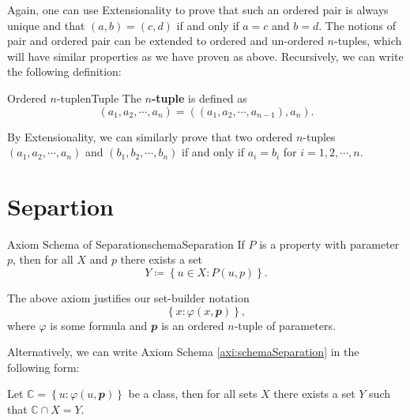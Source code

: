 \documentclass[math]{amznotes}
\theoremstyle{remark}
\begin{document}
Again, one can use Extensionality to prove that such an ordered pair is always unique and that $(a, b) = (c, d)$ if and only if $a = c$ and $b = d$. The notions of pair and ordered pair can be extended to ordered and un-ordered $n$-tuples, which will have similar properties as we have proven as above. Recursively, we can write the following definition:
\begin{dfnbox}{Ordered $n$-tuple}{nTuple}
    The {\color{red} \textbf{$n$-tuple}} is defined as 
    \begin{displaymath}
        (a_1, a_2, \cdots, a_n) = ((a_1, a_2, \cdots, a_{n - 1}), a_n).
    \end{displaymath}
\end{dfnbox}
By Extensionality, we can similarly prove that two ordered $n$-tuples $(a_1, a_2, \cdots, a_n)$ and $(b_1, b_2, \cdots, b_n)$ if and only if $a_i = b_i$ for $i = 1, 2, \cdots, n$.
\section{Separtion}
\begin{axibox}{Axiom Schema of Separation}{schemaSeparation}
    If $P$ is a property with parameter $p$, then for all $X$ and $p$ there exists a set 
    \begin{displaymath}
        Y \coloneqq \left\{u \in X \colon P(u, p)\right\}.
    \end{displaymath}
\end{axibox}
The above axiom justifies our set-builder notation
\begin{displaymath}
    \left\{x \colon \varphi(x, \mathbfit{p})\right\},
\end{displaymath}
where $\varphi$ is some formula and $\mathbfit{p}$ is an ordered $n$-tuple of parameters.

Alternatively, we can write Axiom Schema \ref{axi:schemaSeparation} in the following form:

    Let $\mathbb{C} = \left\{u \colon \varphi(u, \mathbfit{p})\right\}$ be a class, then for all sets $X$ there exists a set $Y$ such that $\mathbb{C} \cap X = Y$.
\end{document}

